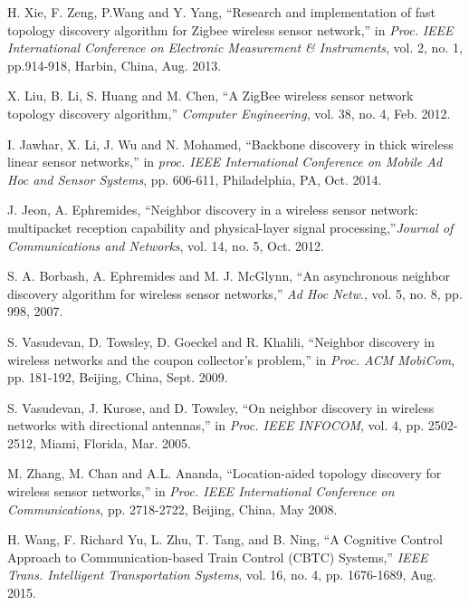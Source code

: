 \documentclass[10pt,english,two column]{IEEEtran}
\begin{document}
\begin{thebibliography}{10}
H. Xie, F. Zeng, P.Wang and Y. Yang, ``Research and
implementation of fast topology discovery algorithm for Zigbee wireless
sensor network,'' in \textit{Proc.} \textit{IEEE International Conference
on Electronic Measurement \& Instruments}, vol. 2, no. 1, pp.914-918,
Harbin, China, Aug. 2013.

X. Liu, B. Li, S. Huang and M. Chen, ``A ZigBee wireless
sensor network topology discovery algorithm,'' \textit{Computer Engineering},
vol. 38, no. 4, Feb. 2012. 

I. Jawhar, X. Li, J. Wu and N. Mohamed, ``Backbone
discovery in thick wireless linear sensor networks,'' in \textit{proc.
IEEE International Conference on Mobile Ad Hoc and Sensor Systems},
pp. 606-611, Philadelphia, PA, Oct. 2014.

J. Jeon, A. Ephremides, \textquotedblleft Neighbor
discovery in a wireless sensor network: multipacket reception capability
and physical-layer signal processing,\textquotedblright \textit{Journal
of Communications and Networks}, vol. 14, no. 5, Oct. 2012.

S. A. Borbash, A. Ephremides and M. J. McGlynn,
\textquotedblleft An asynchronous neighbor discovery algorithm for
wireless sensor networks,\textquotedblright{} \textit{Ad Hoc Netw}.,
vol. 5, no. 8, pp. 998, 2007.

S. Vasudevan, D. Towsley, D. Goeckel and R. Khalili,
\textquotedblleft Neighbor discovery in wireless networks and the
coupon collector\textquoteright s problem,\textquotedblright{} in
\textit{Proc. ACM MobiCom}, pp. 181-192, Beijing, China, Sept. 2009.

S. Vasudevan, J. Kurose, and D. Towsley, \textquotedblleft On
neighbor discovery in wireless networks with directional antennas,\textquotedblright{}
in \textit{Proc. IEEE INFOCOM}, vol. 4, pp. 2502-2512, Miami, Florida,
Mar. 2005.

M. Zhang, M. Chan and A.L. Ananda, ``Location-aided
topology discovery for wireless sensor networks,'' in \textit{Proc.
IEEE International Conference on Communications}, pp. 2718-2722, Beijing,
China, May 2008.

H. Wang, F. Richard Yu, L. Zhu, T. Tang, and B.
Ning, \textquotedblleft A Cognitive Control Approach to Communication-based
Train Control (CBTC) Systems,\textquotedblright{} \textit{IEEE Trans.
Intelligent Transportation Systems}, vol. 16, no. 4, pp. 1676-1689,
Aug. 2015.


\end{thebibliography}
\end{document}
